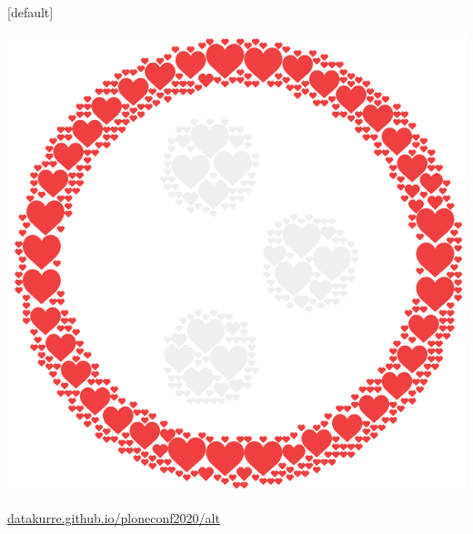 \documentclass[12pt,aspectratio=169]{beamer}
\begin{document}
[default]
\begin{frame}[standout]
\vfill
\includegraphics[height=0.50\paperheight]{images/plone-icon-hearts.png}
\par
\href{https://datakurre.github.io/ploneconf2020/alt}{datakurre.github.io/ploneconf2020/alt}
\end{frame}

\end{document}
